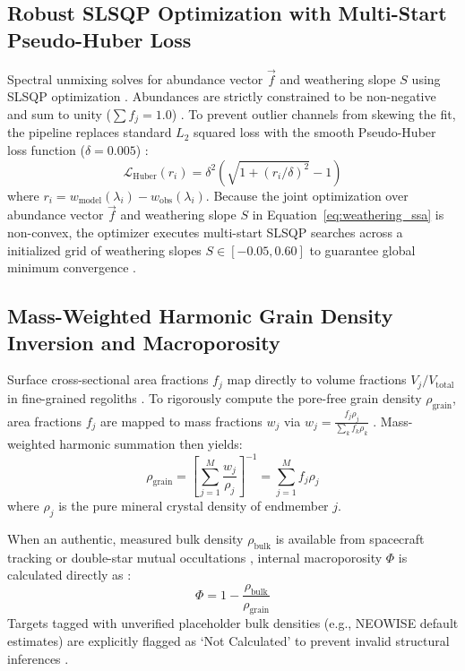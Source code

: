 \documentclass[11pt,a4paper]{article}
\begin{document}
\subsection{Robust SLSQP Optimization with Multi-Start Pseudo-Huber Loss}
Spectral unmixing solves for abundance vector $\vec{f}$ and weathering slope $S$ using SLSQP optimization \cite{Lawson1995}. Abundances are strictly constrained to be non-negative and sum to unity ($\sum f_j = 1.0$) \cite{Lawson1995, Bioucas2012}. To prevent outlier channels from skewing the fit, the pipeline replaces standard $L_2$ squared loss with the smooth Pseudo-Huber loss function ($\delta = 0.005$) \cite{Huber1964, Press2007}:
\begin{equation}
\mathcal{L}_{\text{Huber}}(r_i) = \delta^2 \left( \sqrt{1 + (r_i / \delta)^2} - 1 \right)
\label{eq:pseudo_huber}
\end{equation}
where $r_i = w_{\text{model}}(\lambda_i) - w_{\text{obs}}(\lambda_i)$. Because the joint optimization over abundance vector $\vec{f}$ and weathering slope $S$ in Equation~\ref{eq:weathering_ssa} is non-convex, the optimizer executes multi-start SLSQP searches across a initialized grid of weathering slopes $S \in [-0.05, 0.60]$ to guarantee global minimum convergence \cite{Lawson1995}.

\subsection{Mass-Weighted Harmonic Grain Density Inversion and Macroporosity}
Surface cross-sectional area fractions $f_j$ map directly to volume fractions $V_j / V_{\text{total}}$ in fine-grained regoliths \cite{Hapke1981, Consolmagno2008}. To rigorously compute the pore-free grain density $\rho_{\text{grain}}$, area fractions $f_j$ are mapped to mass fractions $w_j$ via $w_j = \frac{f_j \rho_j}{\sum_{k} f_k \rho_k}$ \cite{Consolmagno2008, Britt2003}. Mass-weighted harmonic summation then yields:
\begin{equation}
\rho_{\text{grain}} = \left[ \sum_{j=1}^{M} \frac{w_j}{\rho_j} \right]^{-1} = \sum_{j=1}^{M} f_j \rho_j
\label{eq:harmonic_density}
\end{equation}
where $\rho_j$ is the pure mineral crystal density of endmember $j$.

When an authentic, measured bulk density $\rho_{\text{bulk}}$ is available from spacecraft tracking or double-star mutual occultations \cite{Carry2012}, internal macroporosity $\Phi$ is calculated directly as \cite{Consolmagno2008, Carry2012}:
\begin{equation}
\Phi = 1 - \frac{\rho_{\text{bulk}}}{\rho_{\text{grain}}}
\label{eq:macroporosity}
\end{equation}
Targets tagged with unverified placeholder bulk densities (e.g., NEOWISE default estimates) are explicitly flagged as `Not Calculated' to prevent invalid structural inferences \cite{Carry2012}.
\end{document}
